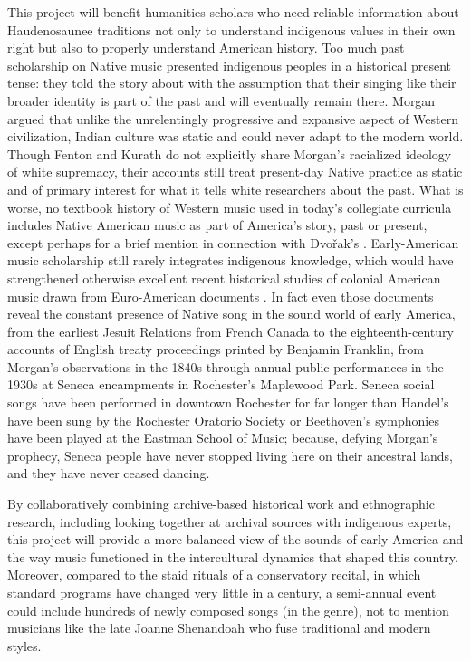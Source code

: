 \documentclass{neh}
\begin{document}
This project will benefit humanities scholars who need reliable information
about Haudenosaunee traditions not only to understand indigenous values in
their own right but also to properly understand American history.
Too much past scholarship on Native music presented indigenous peoples in a
historical present tense: they told the story about 
with the assumption that their singing like their broader identity is part
of the past and will eventually remain there.
Morgan argued that unlike the unrelentingly progressive and expansive aspect
of Western civilization, Indian culture was static and could never adapt to
the modern world.
Though Fenton and Kurath do not explicitly share Morgan's racialized ideology
of white supremacy, their accounts still treat present-day Native practice as
static and of primary interest for what it tells white researchers about the
past.
What is worse, no textbook history of Western music used in today's collegiate
curricula includes Native American music as part of America's story, past or
present, except perhaps for a brief mention in connection with Dvo\v{r}ak's
.
Early-American music scholarship still rarely integrates indigenous knowledge,
which would have strengthened otherwise excellent recent historical studies of
colonial American music drawn from Euro-American documents
\Autocites{Goodman:IndianPsalmody}{Eyerly:Moravian}.
In fact even those documents reveal the constant presence of Native song in
the sound world of early America, from the earliest Jesuit Relations from
French Canada to the eighteenth-century accounts of English treaty proceedings
printed by Benjamin Franklin, from Morgan's observations in the 1840s through
annual public performances in the 1930s at Seneca encampments in Rochester's
Maplewood Park.
Seneca social songs have been performed in downtown Rochester for far longer
than Handel's  have been sung by the Rochester Oratorio
Society or Beethoven's symphonies have been played at the Eastman School of
Music; because, defying Morgan's prophecy, Seneca people have never stopped
living here on their ancestral lands, and they have never ceased dancing.

By collaboratively combining archive-based historical work and ethnographic
research, including looking together at archival sources with indigenous
experts, this project will provide a more balanced view of the sounds of early
America and the way music functioned in the intercultural dynamics that
shaped this country.
Moreover, compared to the staid rituals of a conservatory recital, in which
standard programs have changed very little in a century, a semi-annual
 event could include hundreds of newly composed songs (in the
 genre), not to mention musicians like the late Joanne
Shenandoah who fuse traditional and modern styles.
\end{document}
